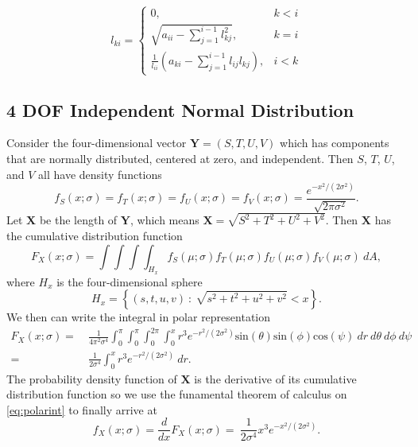 \documentclass[14pt,a4paper]{article}
\begin{document}
\[ 
   l_{ki} = 
	 \begin{cases} 
      0, & k < i \\
      \sqrt{a_{ii} - \sum_{j=1}^{i-1}l^2_{kj}}, & k=i \\
      \frac{1}{l_{ii}} (a_{ki} - \sum_{j=1}^{i-1}l_{ij}l_{kj}), & i < k 
   \end{cases}
\]

\subsection{4 DOF Independent Normal Distribution}
Consider the four-dimensional vector $\textbf{Y} = (S,T,U,V)$ which has components that are normally distributed, centered at zero, and independent. 
Then $S$, $T$, $U$, and $V$ all have density functions
\begin{equation}
f_S(x;\sigma) = f_T(x;\sigma) = f_U(x;\sigma) = f_V(x;\sigma) = \frac{e^{-x^2/(2\sigma^2)}}{\sqrt{2\pi\sigma^2}}.
\label{eq:single_dists}
\end{equation}
Let $\textbf{X}$ be the length of $\textbf{Y}$, which means $\textbf{X} = \sqrt{S^2+T^2+U^2+V^2}$.
Then $\textbf{X}$ has the cumulative distribution function
\begin{equation}
F_X(x;\sigma) = \int \int \int \int_{H_x} f_S(\mu;\sigma)f_T(\mu;\sigma)f_U(\mu;\sigma)f_V(\mu;\sigma) ~dA,
\label{eq:cumdist}
\end{equation}
where $H_x$ is the four-dimensional sphere
\begin{equation}
H_x = \left\{(s,t,u,v)~:~\sqrt{s^2+t^2+u^2+v^2} < x \right\}.
\label{eq:4dsphere}
\end{equation}
We then can write the integral in polar representation
\begin{align}
F_X(x;\sigma) = & ~\frac{1}{4\pi^2\sigma^4} \int_0^\pi \int_0^\pi \int_0^{2\pi} \int_0^x r^3e^{-r^2/(2\sigma^2)} \mbox{sin}(\theta) \mbox{sin}(\phi) \mbox{cos}(\psi) ~dr~d\theta~d\phi~d\psi \nonumber \\
= & ~\frac{1}{2\sigma^4} \int_0^x r^3e^{-r^2/(2\sigma^2)} ~dr.
\label{eq:polarint}
\end{align}
The probability density function of $\textbf{X}$ is the derivative of its cumulative distribution function so we use the funamental theorem of calculus on \eqref{eq:polarint} to finally arrive at
\begin{equation}
f_X(x;\sigma) = \frac{d}{dx}F_X(x;\sigma) =  ~\frac{1}{2\sigma^4} x^3e^{-x^2/(2\sigma^2)}.
\label{eq:finaldist}
\end{equation}

\end{document}
